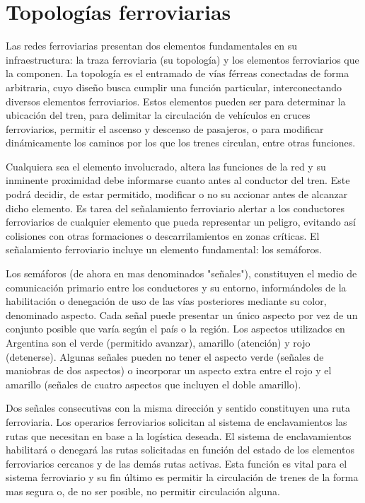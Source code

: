 \section{Topologías ferroviarias}

    Las redes ferroviarias presentan dos elementos fundamentales en su infraestructura: la traza ferroviaria (su topología) y los elementos ferroviarios que la componen. La topología es el entramado de vías férreas conectadas de forma arbitraria, cuyo diseño busca cumplir una función particular, interconectando diversos elementos ferroviarios. Estos elementos pueden ser para determinar la ubicación del tren, para delimitar la circulación de vehículos en cruces ferroviarios, permitir el ascenso y descenso de pasajeros, o para modificar dinámicamente los caminos por los que los trenes circulan, entre otras funciones.

    Cualquiera sea el elemento involucrado, altera las funciones de la red y su inminente proximidad debe informarse cuanto antes al conductor del tren. Este podrá decidir, de estar permitido, modificar o no su accionar antes de alcanzar dicho elemento. Es tarea del señalamiento ferroviario alertar a los conductores ferroviarios de cualquier elemento que pueda representar un peligro, evitando así colisiones con otras formaciones o descarrilamientos en zonas críticas. El señalamiento ferroviario incluye un elemento fundamental: los semáforos.

    Los semáforos (de ahora en mas denominados "señales"), constituyen el medio de comunicación primario entre los conductores y su entorno, informándoles de la habilitación o denegación de uso de las vías posteriores mediante su color, denominado aspecto. Cada señal puede presentar un único aspecto por vez de un conjunto posible que varía según el país o la región. Los aspectos utilizados en Argentina son el verde (permitido avanzar), amarillo (atención) y rojo (detenerse). Algunas señales pueden no tener el aspecto verde (señales de maniobras de dos aspectos) o incorporar un aspecto extra entre el rojo y el amarillo (señales de cuatro aspectos que incluyen el doble amarillo).
    
    Dos señales consecutivas con la misma dirección y sentido constituyen una ruta ferroviaria. Los operarios ferroviarios solicitan al sistema de enclavamientos las rutas que necesitan en base a la logística deseada. El sistema de enclavamientos habilitará o denegará las rutas solicitadas en función del estado de los elementos ferroviarios cercanos y de las demás rutas activas. Esta función es vital para el sistema ferroviario y su fin último es permitir la circulación de trenes de la forma mas segura o, de no ser posible, no permitir circulación alguna.

    
    
    
    
    